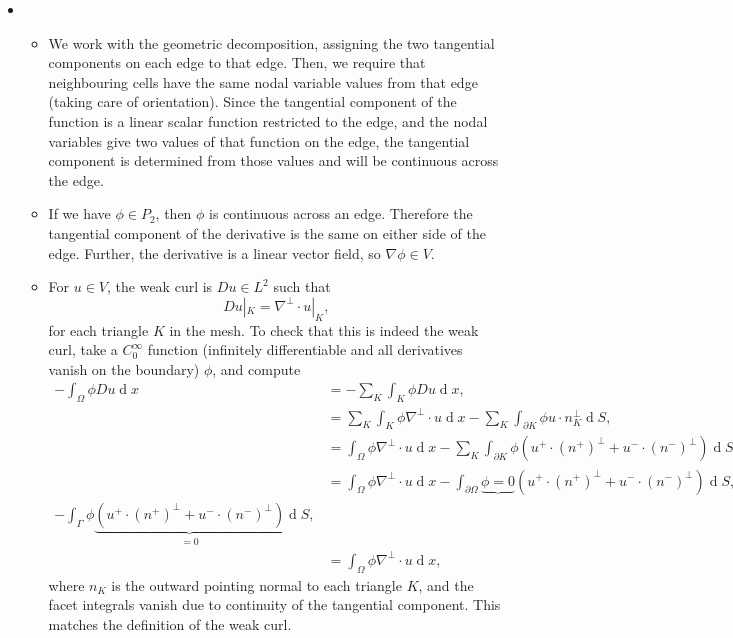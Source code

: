 \documentclass[11pt]{article}
\newcommand{\marb}[1]{\marginpar{~~\fbox{\,\mathstrut #1\,}}}
\newcommand{\marbup}[1]{\vspace*{-4mm} \par \marb{#1}}
\newcommand{\unseen}{\marbup{{\small unseen $\Downarrow$}}}
\newcommand{\simseen}{\marbup{{\small sim. seen $\Downarrow$}}}
\DeclareMathOperator{\diff}{d}
\newcounter{count_marks}
\newcounter{count_amarks}
\newcounter{count_bmarks}
\newcounter{count_cmarks}
\newcounter{count_dmarks}
\newcounter{count_mmarks} %
\newcommand{\cmarks}[1]{\addtocounter{count_marks}{#1} \addtocounter{count_cmarks}{#1}\marginpar{~~\fbox{\,\mathstrut #1, C}}}
\newcommand{\dmarks}[1]{\addtocounter{count_marks}{#1} \addtocounter{count_dmarks}{#1}\marginpar{~~\fbox{\,\mathstrut #1, D}}}
\newenvironment{Question}[1] 
 {\begin{itemize} \item[\large #1.~~]}{\end{itemize}\vfill
}
\newenvironment{Part}[1] 
 {\begin{itemize} \item[(#1)~~]}{\end{itemize}}
\begin{document}
\begin{Question}{3}
  \begin{Part}{a}\unseen
    We work with the geometric decomposition, assigning
    the two tangential components on each edge to that edge.
    Then, we require that neighbouring cells have the same
    nodal variable values from that edge (taking care
    of orientation). Since the tangential component of the
    function is a linear scalar function restricted to the edge,
    and the nodal variables give two values of that function on the
    edge, the tangential component is determined from those values
    and will be continuous across the edge.
    \cmarks{6}
  \end{Part}
  \begin{Part}{b}\unseen
    If we have $\phi\in P_2$, then $\phi$ is continuous across an edge.
    Therefore the tangential component of the derivative is the same
    on either side of the edge. Further, the derivative is a linear
    vector field, so $\nabla\phi\in V$.
    \dmarks{8}
  \end{Part}
  \begin{Part}{c}\simseen
    For $u\in V$, the weak curl is $Du\in L^2$ such that
    \begin{equation}
      Du|_K = \nabla^{\perp}\cdot u|_K,
    \end{equation}
    for each triangle $K$ in the mesh. To check that this is indeed
    the weak curl, take a $C^\infty_0$ function (infinitely
    differentiable and all derivatives vanish on the boundary) $\phi$,
    and compute
    \begin{align}
      -\int_\Omega \phi Du \diff x & = -\sum_K \int_K
      \phi Du \diff x, \\
      & = \sum_K \int_K \phi \nabla^\perp\cdot u \diff x
      - \sum_K \int_{\partial K} \phi u\cdot n_K^\perp \diff S, \\
     & = \int_\Omega \phi \nabla^\perp\cdot u \diff x
      - \sum_K \int_{\partial K} \phi (u^+\cdot (n^+)^{\perp} + u^-\cdot (n^-)^{\perp}) \diff S, \\
      & = \int_\Omega \phi \nabla^\perp\cdot u \diff x
      - \int_{\partial \Omega} \underbrace{\phi=0}
      (u^+\cdot (n^+)^{\perp} + u^-\cdot (n^-)^{\perp}) \diff S, \\
      - \int_{\Gamma} \phi \underbrace{(u^+\cdot (n^+)^{\perp} + u^-\cdot (n^-)^{\perp})}_{=0} \diff S, \\
      & = \int_\Omega \phi \nabla^\perp\cdot u \diff x,
    \end{align}
    where $n_K$ is the outward pointing normal to each triangle $K$,
    and the facet integrals vanish due to continuity of the tangential
    component. This matches the definition of the weak curl.
    \cmarks{6}
  \end{Part}
\end{Question}
\end{document}
